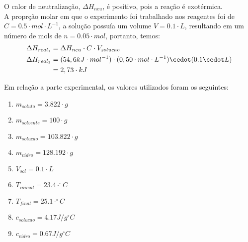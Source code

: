             \indent O calor de neutralização, $\Delta{H_{neu}}$, é positivo, pois a reação é exotérmica.\\
            \indent A proprção molar em que o experimento foi trabalhado nos reagentes foi de $C = 0.5 \cdot mol \cdot L^{-1}$, a solução possuía um volume $V = 0.1\cdot L$, resultando em um número de mols de $n = 0.05 \cdot mol$, portanto, temos:\\
            \begin{equation}
                \begin{split}
                	\notag
                    \Delta{H_{real_1}} &= \Delta{H_{neu}} \cdot C \cdot V_{solucao}\\
                    \Delta{H_{real_1}} &=(54,6 kJ \cdot mol^{-1}) \cdot (0,50 \cdot mol \cdot L^{-1}) \cedot (0.1 \cedot L) \\
                    &= 2,73 \cdot kJ\\
                \end{split}\label{eq:equation}
            \end{equation}     
            
            \indent Em relação a parte experimental, os valores utilizados foram os seguintes:\\
            \begin{enumerate}
            	\item $m_{soluto} = 3.822 \cdot g$
                \item $m_{solvente} = 100 \cdot g$
                \item $m_{solucao} = 103.822 \cdot g$
                \item $m_{vidro} = 128.192 \cdot g$
                \item $V_{sol} = 0.1 \cdot L$
                \item $T_{inicial} = 23.4 \cdot ^{\circ}C$
                \item $T_{final} = 25.1 \cdot ^{\circ}C$
                \item $c_{solucao} = 4.17 J /g ^{\circ}C$
                \item $c_{vidro} = 0.67 J / g ^{\circ}C$
            \end{enumerate}

